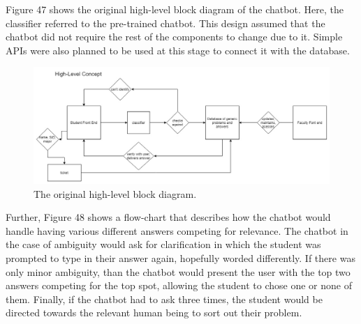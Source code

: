 \documentclass[titlepage, 12pt]{article}
\begin{document}
Figure 47 shows the original high-level block diagram of the chatbot. Here, the classifier referred to the pre-trained chatbot. This design assumed that the chatbot did not require the rest of the components to change due to it. Simple APIs were also planned to be used at this stage to connect it with the database.


\begin{figure}[h]
    \centering\includegraphics[width=1\linewidth]{images/original-high-level-diagram.png}
    \caption{The original high-level block diagram.}
\end{figure}


Further, Figure 48 shows a flow-chart that describes how the chatbot would handle having various different answers competing for relevance. The chatbot in the case of ambiguity would ask for clarification in which the student was prompted to type in their answer again, hopefully worded differently. If there was only minor ambiguity, than the chatbot would present the user with the top two answers competing for the top spot, allowing the student to chose one or none of them. Finally, if the chatbot had to ask three times, the student would be directed towards the relevant human being to sort out their problem.
\end{document}
